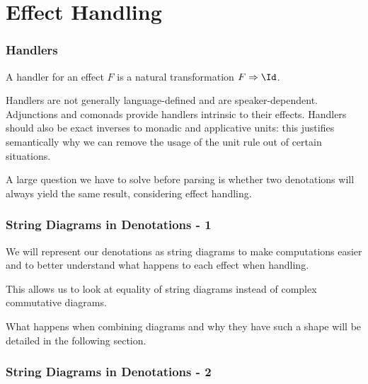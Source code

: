 \documentclass[math, english, info, noamsthm]{beamercours}
\begin{document}
\section{Effect Handling}
\begin{frame}
	\frametitle{Handlers}
	A handler for an effect $F$ is a natural transformation $F \Rightarrow \Id$.

	\smallskip

	Handlers are not generally language-defined and are speaker-dependent.
	Adjunctions and comonads provide handlers intrinsic to their effects.
	Handlers should also be exact inverses to monadic and applicative units:
	this justifies semantically why we can remove the usage of the unit rule out
	of certain situations.

	\smallskip

	A large question we have to solve before parsing is whether two denotations
	will always yield the same result, considering effect handling.
\end{frame}

\begin{frame}
	\frametitle{String Diagrams in Denotations - 1}
	We will represent our denotations as string diagrams to make computations
	easier and to better understand what happens to each effect when handling.

	\medskip

	This allows us to look at equality of string diagrams instead of complex
	commutative diagrams.

	\medskip

	What happens when combining diagrams and why they have such a shape will be
	detailed in the following section.
\end{frame}

\begin{frame}[fragile]
	\frametitle{String Diagrams in Denotations - 2}
	\begin{center}
	\end{center}
\end{frame}
\end{document}
